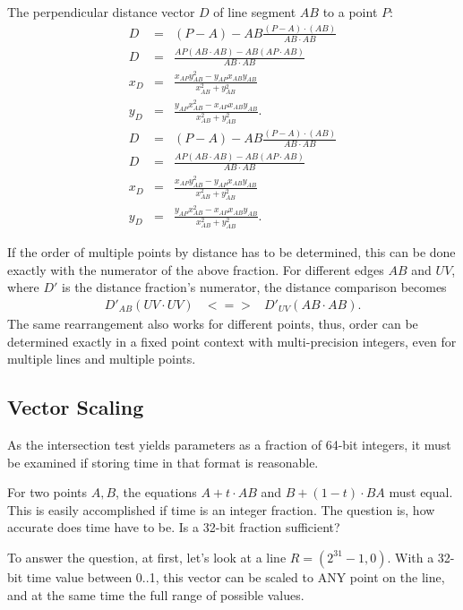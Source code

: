 \documentclass[12pt,a4paper,oneside,openany]{article}
\begin{document}
The perpendicular distance vector $D$ of line segment $AB$ to a point $P$:
\begin{eqnarray*}
D &=& (P-A) - AB\frac{(P-A) \cdot (AB)}{AB \cdot AB}  \\
D &=& \frac{AP (AB \cdot AB) - AB (AP \cdot AB)}{AB \cdot AB} \\
x_D &=& \frac{x_{AP}y^2_{AB} - y_{AP}x_{AB}y_{AB}}{x_{AB}^2+y_{AB}^2} \\
y_D &=& \frac{y_{AP}x^2_{AB} - x_{AP}x_{AB}y_{AB}}{x_{AB}^2+y_{AB}^2} .
\end{eqnarray*}
\begin{eqnarray*}
D &=& (P-A) - AB\frac{(P-A) \cdot (AB)}{AB \cdot AB}  \\
D &=& \frac{AP (AB \cdot AB) - AB (AP \cdot AB)}{AB \cdot AB} \\
x_D &=& \frac{x_{AP}y^2_{AB} - y_{AP}x_{AB}y_{AB}}{x_{AB}^2+y_{AB}^2} \\
y_D &=& \frac{y_{AP}x^2_{AB} - x_{AP}x_{AB}y_{AB}}{x_{AB}^2+y_{AB}^2} .
\end{eqnarray*}

If the order of multiple points by distance has to be determined, this can be done exactly with the numerator of the above fraction. For different edges $AB$ and $UV$, where $D'$ is the distance fraction's numerator, the distance comparison becomes
\begin{eqnarray*}
D'_{AB} (UV \cdot UV) &<=>& D'_{UV} (AB \cdot AB) .
\end{eqnarray*}
The same rearrangement also works for different points, thus, order can  be determined exactly in a fixed point context with multi-precision integers, even for multiple lines and multiple points.


\subsection{Vector Scaling}

As the intersection test yields parameters as a fraction of 64-bit integers, it must be examined if storing time in that format is reasonable.

For two points $A,B$, the equations $A + t \cdot AB$ and $B + (1-t) \cdot BA$ must equal. This is easily accomplished if time is an integer fraction. The question is, how accurate does time have to be. Is a 32-bit fraction sufficient?

To answer the question, at first, let's look at a line $R = (2^{31}-1,0)$. With a 32-bit time value between 0..1, this vector can be scaled to ANY point on the line, and at the same time the full range of possible values.
\end{document}
